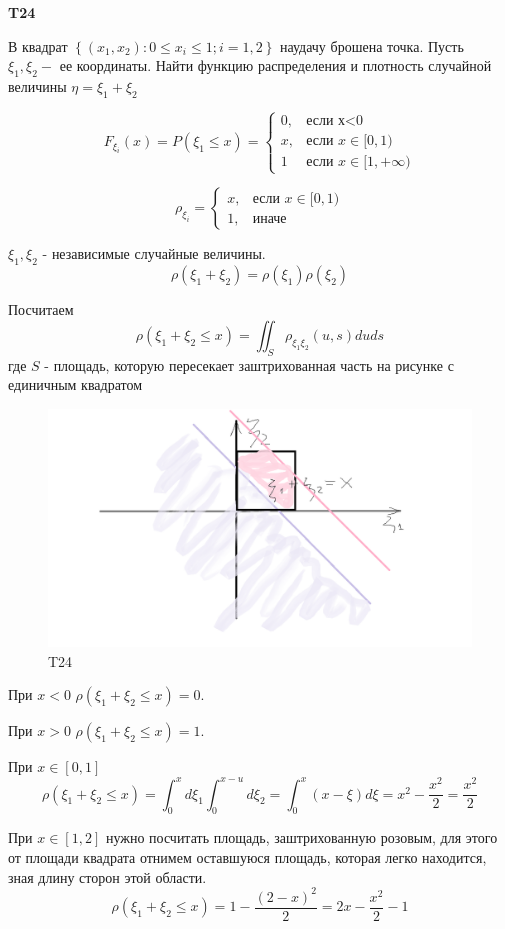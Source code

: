 \documentclass[a4paper,12pt]{article} %
\begin{document}
\begin{example}\textbf{T24}

В квадрат $\left\{\left(x_{1}, x_{2}\right): 0 \leqslant x_{i} \leqslant 1 ; i=1,2\right\}$ наудачу брошена точка. 
Пусть $\xi_{1}, \xi_{2}-$ ее координаты. 
Найти функцию распределения и плотность случайной величины $\eta=\xi_{1}+\xi_{2}$


\[ F_{\xi_i}(x)=P(\xi_1 \le x) = 
\begin{cases} 
0, & \text{если х<0} \\ 
x, &\text{если }  x\in[0,1) \\
1 &\text{если }  x\in[1,+\infty)   
\end{cases}  \]


\[ \rho_{\xi_i}= 
\begin{cases} 
x, &\text{если }  x\in[0,1) \\
1, &\text{иначе } 
\end{cases}  \]


$ \xi_1,\xi_2$ - независимые случайные величины.
\[ \rho(\xi_1+\xi_2)= \rho(\xi_1) \rho(\xi_2)\]

Посчитаем 
\[ \rho(\xi_1+\xi_2\le x) =\iint_S \rho_{\xi_1 \xi_2} (u,s) du ds \]
где $S$ - площадь, которую пересекает заштрихованная часть на рисунке с единичным квадратом

\begin{figure}[h!]
\centering
\includegraphics[width=0.7\linewidth]{t24}
\caption{T24}
\label{fig:t24}
\end{figure}

При $x<0$  $ \rho(\xi_1+\xi_2\le x)=0$.

При $x>0$  $ \rho(\xi_1+\xi_2\le x)=1$.

При $ x\in [0,1] $
\[ \rho(\xi_1+\xi_2\le x) =\int_0^x d\xi_1 \int_0^{x-u} d\xi_2= \int_0^x (x-\xi) d\xi= x^2-\frac{x^2}{2}=\frac{x^2}{2} \]

При $ x\in [1,2] $ нужно посчитать площадь, заштрихованную розовым, для этого от площади квадрата отнимем 
оставшуюся площадь, которая легко находится, зная длину сторон этой области.
\[ \rho(\xi_1+\xi_2\le x) =1-\frac{(2-x)^2}{2}=2x-\frac{x^2}{2}-1
\]


\end{example}
\end{document}
